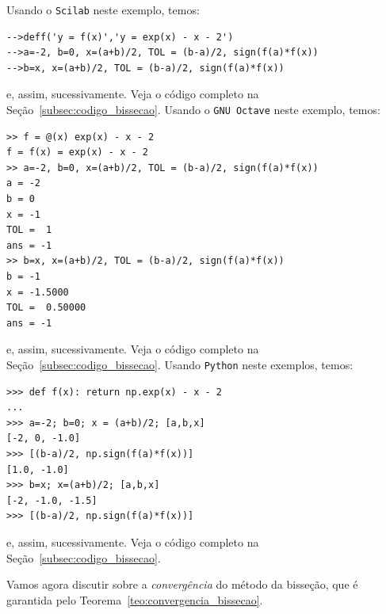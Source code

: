\begin{sol}
\ifisscilab
Usando o \verb+Scilab+ neste exemplo, temos:
\begin{verbatim}
-->deff('y = f(x)','y = exp(x) - x - 2')
-->a=-2, b=0, x=(a+b)/2, TOL = (b-a)/2, sign(f(a)*f(x))
-->b=x, x=(a+b)/2, TOL = (b-a)/2, sign(f(a)*f(x))
\end{verbatim}
  e, assim, sucessivamente. Veja o código completo na Seção~\ref{subsec:codigo_bissecao}.
\fi
\ifisoctave
Usando o \verb+GNU Octave+ neste exemplo, temos:
\begin{verbatim}
>> f = @(x) exp(x) - x - 2
f = f(x) = exp(x) - x - 2
>> a=-2, b=0, x=(a+b)/2, TOL = (b-a)/2, sign(f(a)*f(x))
a = -2
b = 0
x = -1
TOL =  1
ans = -1
>> b=x, x=(a+b)/2, TOL = (b-a)/2, sign(f(a)*f(x))
b = -1
x = -1.5000
TOL =  0.50000
ans = -1
\end{verbatim}
e, assim, sucessivamente. Veja o código completo na Seção~\ref{subsec:codigo_bissecao}.
\fi
\ifispython
Usando \verb+Python+ neste exemplos, temos:
\begin{verbatim}
>>> def f(x): return np.exp(x) - x - 2
...
>>> a=-2; b=0; x = (a+b)/2; [a,b,x]
[-2, 0, -1.0]
>>> [(b-a)/2, np.sign(f(a)*f(x))]
[1.0, -1.0]
>>> b=x; x=(a+b)/2; [a,b,x]
[-2, -1.0, -1.5]
>>> [(b-a)/2, np.sign(f(a)*f(x))]
\end{verbatim}
e, assim, sucessivamente. Veja o código completo na Seção~\ref{subsec:codigo_bissecao}.
\fi
\end{sol}

Vamos agora discutir sobre a \emph{convergência} do método da bisseção, que é garantida pelo Teorema~\ref{teo:convergencia_bissecao}.

